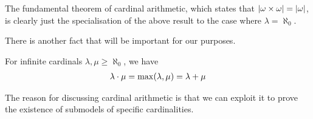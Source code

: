 The fundamental theorem of cardinal arithmetic, which states that $\left\lvert \omega \times \omega \right\rvert = \left\lvert \omega \right\rvert$, is clearly just the specialisation of the above result to the case where $\lambda = \aleph_{0}$.

There is another fact that will be important for our purposes.

\begin{boxtheorem}
    For infinite cardinals $\lambda, \mu \geq \aleph_{0}$, we have
    \begin{align*}
        \lambda \cdot \mu = \max\!\left( \lambda, \mu \right) = \lambda + \mu
    \end{align*}
\end{boxtheorem}

The reason for discussing cardinal arithmetic is that we can exploit it to prove the existence of submodels of specific cardinalities.
